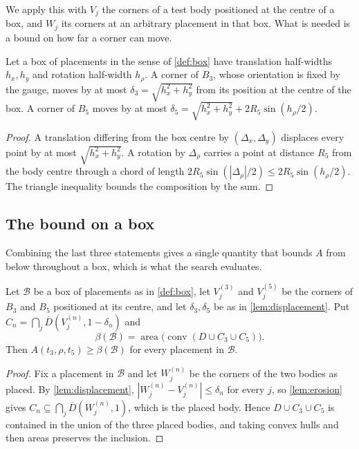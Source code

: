 \documentclass[a4paper,UKenglish,cleveref,autoref,thm-restate,numberwithinsect]{lipics-v2021}
\begin{document}
We apply this with $V_j$ the corners of a test body positioned at the centre of a
box, and $W_j$ its corners at an arbitrary placement in that box. What is needed
is a bound on how far a corner can move.

\begin{lemma}
\label{lem:displacement}
Let a box of placements in the sense of \cref{def:box} have translation
half-widths $h_x,h_y$ and rotation half-width $h_\rho$. A corner of $B_3$, whose orientation is fixed
by the gauge, moves by at most $\delta_3=\sqrt{h_x^{2}+h_y^{2}}$ from its
position at the centre of the box. A corner of $B_5$ moves by at most
$\delta_5=\sqrt{h_x^{2}+h_y^{2}}+2R_5\sin(h_\rho/2)$.
\end{lemma}

\begin{proof}
A translation differing from the box centre by $(\Delta_x,\Delta_y)$ displaces
every point by at most $\sqrt{h_x^{2}+h_y^{2}}$. A rotation by $\Delta_\rho$
carries a point at distance $R_5$ from the body centre through a chord of length
$2R_5\sin(|\Delta_\rho|/2)\le2R_5\sin(h_\rho/2)$. The triangle inequality bounds
the composition by the sum.
\end{proof}

\subsection{The bound on a box}

Combining the last three statements gives a single quantity that bounds $A$ from
below throughout a box, which is what the search evaluates.

\begin{proposition}
\label{prop:boxbound}
Let $\mathcal{B}$ be a box of placements as in \cref{def:box}, let $V^{(3)}_j$
and $V^{(5)}_j$ be the
corners of $B_3$ and $B_5$ positioned at its centre, and let $\delta_3,\delta_5$
be as in \cref{lem:displacement}. Put
$C_n=\bigcap_j\overline{D}(V^{(n)}_j,1-\delta_n)$ and
\[
  \beta(\mathcal{B})=\operatorname{area}
  \bigl(\operatorname{conv}(D\cup C_3\cup C_5)\bigr).
\]
Then $A(t_3,\rho,t_5)\ge\beta(\mathcal{B})$ for every placement in $\mathcal{B}$.
\end{proposition}

\begin{proof}
Fix a placement in $\mathcal{B}$ and let $W^{(n)}_j$ be the corners of the two
bodies as placed. By \cref{lem:displacement}, $|W^{(n)}_j-V^{(n)}_j|\le\delta_n$
for every $j$, so \cref{lem:erosion} gives $C_n\subseteq\bigcap_j
\overline{D}(W^{(n)}_j,1)$, which is the placed body. Hence
$D\cup C_3\cup C_5$ is contained in the union of the three placed bodies, and
taking convex hulls and then areas preserves the inclusion.
\end{proof}
\end{document}
